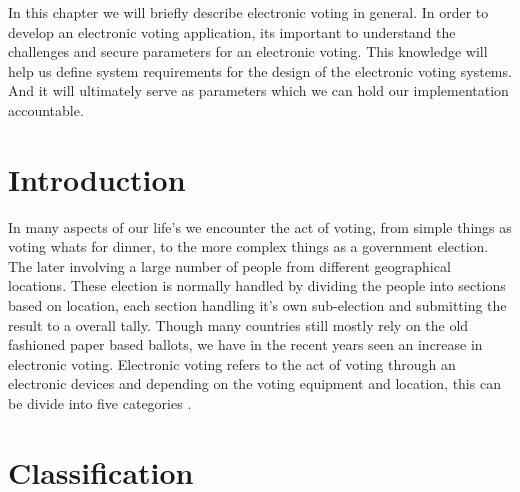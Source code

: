 In this chapter we will briefly describe electronic voting in general. In order to develop an electronic voting application, its important to understand the challenges and secure parameters for an electronic voting. This knowledge will help us define system requirements for the design of the electronic voting systems. And it will ultimately serve as parameters which we can hold our implementation accountable. 


\section{Introduction}
In many aspects of our life's we encounter the act of voting, from simple things as voting whats for dinner, to the more complex things as a government election. The later involving a large number of people from different geographical locations. These election is normally handled by dividing the people into sections based on location, each section handling it's own sub-election and submitting the result to a overall tally. Though many countries still mostly rely on the old fashioned paper based ballots, we have in the recent years seen an increase in electronic voting. Electronic voting refers to the act of voting through an electronic devices and depending on the voting equipment and location, this can be divide into five categories \cite{Cet09}. 

\section{Classification} \label{sec:voting:classification}

